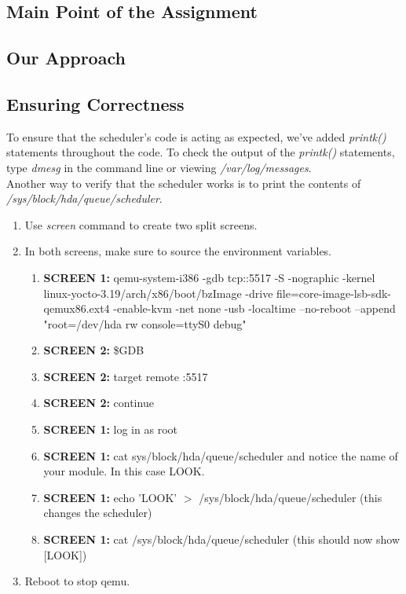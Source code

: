 \documentclass[draftclsnofoot, onecolumn, 10pt, compsoc]{IEEEtran}
\begin{document}
		\subsection{Main Point of the Assignment}
	
		\subsection{Our Approach}
	
		\subsection{Ensuring Correctness}
			To ensure that the scheduler's code is acting as expected, we've added \textit{printk()} statements throughout the code. To check the output of the \textit{printk()} statements, type \textit{dmesg} in the command line or viewing \textit{/var/log/messages}. \\
			Another way to verify that the scheduler works is to print the contents of \textit{/sys/block/hda/queue/scheduler}.
			\begin{enumerate}
				\item Use \textit{screen} command to create two split screens.
				\item In both screens, make sure to source the environment variables.
				\begin{enumerate}
					\item \textbf{SCREEN 1:} qemu-system-i386 -gdb tcp::5517 -S -nographic -kernel linux-yocto-3.19/arch/x86/boot/bzImage -drive file=core-image-lsb-sdk-qemux86.ext4 -enable-kvm -net none -usb -localtime --no-reboot --append "root=/dev/hda rw console=ttyS0 debug"
					\item \textbf{SCREEN 2:} \$GDB
					\item \textbf{SCREEN 2:} target remote :5517
					\item \textbf{SCREEN 2:} continue
					\item \textbf{SCREEN 1:} log in as root
					\item \textbf{SCREEN 1:} cat sys/block/hda/queue/scheduler and notice the name of your module. In this case LOOK.
					\item \textbf{SCREEN 1:} echo 'LOOK' $>$ /sys/block/hda/queue/scheduler (this changes the scheduler)
					\item \textbf{SCREEN 1:} cat /sys/block/hda/queue/scheduler (this should now show [LOOK])
				\end{enumerate}
				\item Reboot to stop qemu.
			\end{enumerate}	
	
\end{document}
